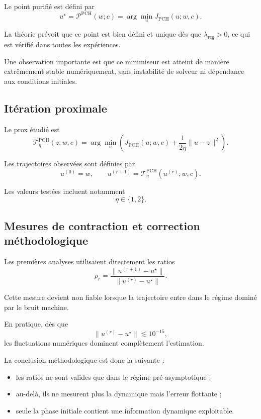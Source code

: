 \documentclass[11pt,a4paper]{article}
\newcommand{\1}{\mathbf 1}
\begin{document}
Le point purifié est défini par
\[
u^\star = \mathcal P^{\mathrm{PCH}}(w;c)
=
\arg\min_u J_{\mathrm{PCH}}(u;w,c).
\]

La théorie prévoit que ce point est bien défini et unique dès que \(\lambda_{\mathrm{reg}}>0\), ce qui est vérifié dans toutes les expériences.

Une observation importante est que ce minimiseur est atteint de manière extrêmement stable numériquement, sans instabilité de solveur ni dépendance aux conditions initiales.

\subsection{Itération proximale}

Le prox étudié est
\[
\mathcal T_\eta^{\mathrm{PCH}}(z;w,c)
=
\arg\min_u
\left(
J_{\mathrm{PCH}}(u;w,c)
+
\frac1{2\eta}\|u-z\|^2
\right).
\]

Les trajectoires observées sont définies par
\[
u^{(0)} = w,
\qquad
u^{(r+1)} = \mathcal T_\eta^{\mathrm{PCH}}(u^{(r)};w,c).
\]

Les valeurs testées incluent notamment
\[
\eta \in \{1,2\}.
\]

\subsection{Mesures de contraction et correction méthodologique}

Les premières analyses utilisaient directement les ratios
\[
\rho_r
=
\frac{\|u^{(r+1)}-u^\star\|}{\|u^{(r)}-u^\star\|}.
\]

Cette mesure devient non fiable lorsque la trajectoire entre dans le régime dominé par le bruit machine.

En pratique, dès que
\[
\|u^{(r)}-u^\star\| \lesssim 10^{-15},
\]
les fluctuations numériques dominent complètement l’estimation.

La conclusion méthodologique est donc la suivante :

\begin{itemize}
\item les ratios ne sont valides que dans le régime pré-asymptotique ;
\item au-delà, ils ne mesurent plus la dynamique mais l’erreur flottante ;
\item seule la phase initiale contient une information dynamique exploitable.
\end{itemize}
\end{document}
